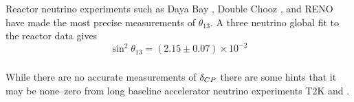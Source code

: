 {\subsubsection*{}
Reactor neutrino experiments such as Daya Bay \cite{TODO}, Double Chooz
\cite{TODO}, and RENO \cite{TODO} have made the most precise measurements of
$\theta_{13}$. A three neutrino global fit to the reactor data gives 
\cite{Capozzi:2016rtj, TODO}
\begin{equation}
	\sin^2 \theta_{13} = (2.15 \pm 0.07) \times 10^{-2}
	\label{eqn:theta_13}
\end{equation}

\subsubsection*{}
While there are no accurate measurements of $\delta_{CP}$ there are some hints that it
may be none--zero from long baseline accelerator neutrino experiments T2K and
\nova.

}
